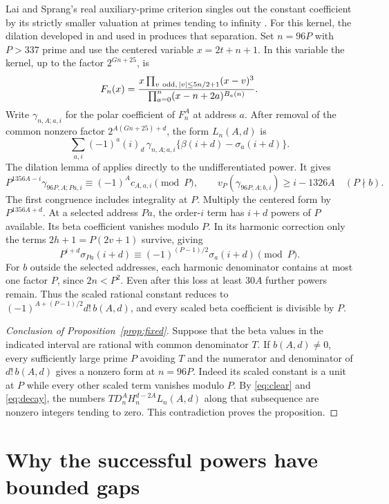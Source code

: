 \documentclass[11pt]{article}
\numberwithin{equation}{section}
\begin{document}
Lai and Sprang's real auxiliary-prime criterion singles out the
constant coefficient by its strictly smaller valuation at primes
tending to infinity \cite[Lemma~2.3]{laisprang}. For this kernel,
the dilation developed in \cite[Section~4]{powered} and used in
\cite[Section~5]{fifteen,two} produces that separation.
Set \(n=96P\) with \(P>337\) prime and
use the centered variable \(x=2t+n+1\). In this variable the kernel,
up to the factor \(2^{Gn+25}\), is
\[
 F_n(x)=\frac{x\prod_{v\ {\rm odd},\,|v|\le5n/2+1}(x-v)^3}
                    {\prod_{a=0}^n(x-n+2a)^{B_a(n)}} .
\]
Write \(\gamma_{n,A;a,i}\) for the polar coefficient of \(F_n^A\)
at address \(a\). After removal of the common nonzero factor
\(2^{A(Gn+25)+d}\), the form \(L_n(A,d)\) is
\[
 \sum_{a,i}(-1)^a(i)_d\,\gamma_{n,A;a,i}
                          \{\beta(i+d)-\sigma_a(i+d)\}.
\]
The dilation lemma of \cite[Section 5]{two} applies directly to the
undifferentiated power. It gives
\[
 P^{1356A-i}\gamma_{96P,A;Pa,i}\equiv(-1)^A c_{A,a,i}\pmod P,\qquad
 v_P(\gamma_{96P,A;b,i})\ge i-1326A\quad(P\nmid b).
\]
The first congruence includes integrality at \(P\).
Multiply the centered form by \(P^{1356A+d}\). At a selected address
\(Pa\), the order-\(i\) term has \(i+d\) powers of \(P\) available.
Its beta coefficient vanishes modulo \(P\). In its harmonic correction
only the terms \(2h+1=P(2v+1)\) survive, giving
\[
        P^{i+d}\sigma_{Pa}(i+d)\equiv
        (-1)^{(P-1)/2}\sigma_a(i+d)\pmod P .
\]
For \(b\) outside the selected addresses, each harmonic denominator
contains at most one factor \(P\), since \(2n<P^2\).
Even after this loss at least \(30A\) further powers remain. Thus
the scaled rational constant reduces to
\((-1)^{A+(P-1)/2}d!\,b(A,d)\), and every scaled beta coefficient
is divisible by \(P\).

\begin{proof}[Conclusion of Proposition~\ref{prop:fixed}]
Suppose that the beta values in the indicated interval are rational
with common denominator \(T\). If \(b(A,d)\ne0\), every sufficiently
large prime \(P\) avoiding \(T\) and the numerator and denominator of
\(d!\,b(A,d)\) gives a nonzero form at \(n=96P\). Indeed its scaled
constant is a unit at \(P\) while every other scaled term vanishes
modulo \(P\). By \eqref{eq:clear} and \eqref{eq:decay}, the numbers
\(T D_n^A H_n^{d-2A}L_n(A,d)\) along that subsequence are nonzero
integers tending to zero. This contradiction proves the proposition.
\end{proof}

\section{Why the successful powers have bounded gaps}\label{sec:gaps}
\end{document}
